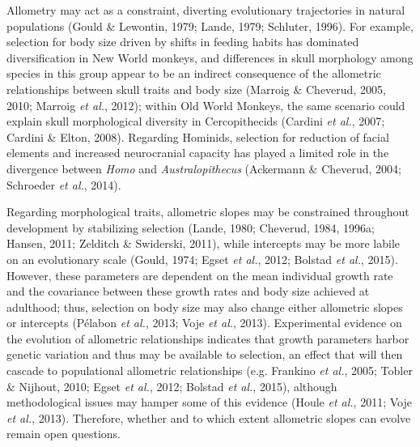 \documentclass[12pt,twoside]{report}
\begin{document}
Allometry may act as a constraint, diverting evolutionary trajectories
in natural populations (Gould \& Lewontin, 1979; Lande, 1979; Schluter,
1996). For example, selection for body size driven by shifts in feeding
habits has dominated diversification in New World monkeys, and
differences in skull morphology among species in this group appear to be
an indirect consequence of the allometric relationships between skull
traits and body size (Marroig \& Cheverud, 2005, 2010; Marroig \emph{et
al.}, 2012); within Old World Monkeys, the same scenario could explain
skull morphological diversity in Cercopithecids (Cardini \emph{et al.},
2007; Cardini \& Elton, 2008). Regarding Hominids, selection for
reduction of facial elements and increased neurocranial capacity has
played a limited role in the divergence between \emph{Homo} and
\emph{Australopithecus} (Ackermann \& Cheverud, 2004; Schroeder \emph{et
al.}, 2014).

Regarding morphological traits, allometric slopes may be constrained
throughout development by stabilizing selection (Lande, 1980; Cheverud,
1984, 1996a; Hansen, 2011; Zelditch \& Swiderski, 2011), while
intercepts may be more labile on an evolutionary scale (Gould, 1974;
Egset \emph{et al.}, 2012; Bolstad \emph{et al.}, 2015). However, these
parameters are dependent on the mean individual growth rate and the
covariance between these growth rates and body size achieved at
adulthood; thus, selection on body size may also change either
allometric slopes or intercepts (Pélabon \emph{et al.}, 2013; Voje
\emph{et al.}, 2013). Experimental evidence on the evolution of
allometric relationships indicates that growth parameters harbor genetic
variation and thus may be available to selection, an effect that will
then cascade to populational allometric relationships (e.g. Frankino
\emph{et al.}, 2005; Tobler \& Nijhout, 2010; Egset \emph{et al.}, 2012;
Bolstad \emph{et al.}, 2015), although methodological issues may hamper
some of this evidence (Houle \emph{et al.}, 2011; Voje \emph{et al.},
2013). Therefore, whether and to which extent allometric slopes can
evolve remain open questions.
\end{document}
